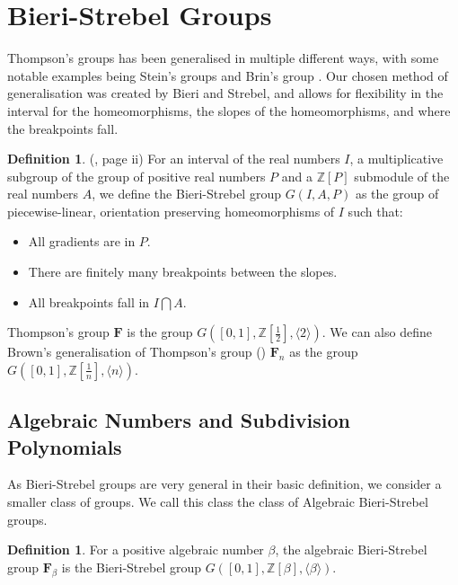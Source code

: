 \documentclass[
11pt, %
english, %
singlespacing, %
parskip, %
headsepline, %
]{amsart} %
\theoremstyle{definition}
\newtheorem{definition}[theorem]{Definition}
\newcommand{\TF}{\textbf{F}}
\newcommand{\FN}[1]{$\textbf{F}_{#1}$}
\begin{document}
\section{Bieri-Strebel Groups}

Thompson's groups has been generalised in multiple different ways, with some notable examples being Stein's groups \cite{Stein} and Brin's group \cite{Brin2}. Our chosen method of generalisation was created by Bieri and Strebel, and allows for flexibility in the interval for the homeomorphisms, the slopes of the homeomorphisms, and where the breakpoints fall. 

\begin{definition}\label{BSgroups}
(\cite{BSgroups}, page ii) For an interval of the real numbers $I$, a multiplicative subgroup of the group of positive real numbers $P$ and a $\mathbb{Z}[P]$ submodule of the real numbers $A$, we define the Bieri-Strebel group $G(I,A,P)$ as the group of piecewise-linear, orientation preserving homeomorphisms of $I$ such that:

\begin{itemize}
\item All gradients are in $P$.
\item There are finitely many breakpoints between the slopes.
\item All breakpoints fall in $I \bigcap A$.
\end{itemize}
\end{definition}

Thompson's group $\TF$ is the group $G([0,1],\mathbb{Z}[\frac{1}{2}], \langle 2 \rangle)$. We can also define Brown's generalisation of Thompson's group (\cite{Brown}) \FN{n} as the group $G([0,1],\mathbb{Z}[\frac{1}{n}], \langle n \rangle)$.
\subsection{Algebraic Numbers and Subdivision Polynomials} \label{subdivide}

As Bieri-Strebel groups are very general in their basic definition, we consider a smaller class of groups. We call this class the class of Algebraic Bieri-Strebel groups.

\begin{definition}\label{algdef}
For a positive algebraic number $\beta$, the algebraic Bieri-Strebel group \FN{\beta} is the Bieri-Strebel group $G([0,1], \mathbb{Z}[\beta], \langle \beta \rangle)$.
\end{definition} 
\end{document}
